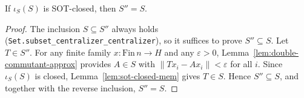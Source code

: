 \begin{theorem}
    \label{thm:sot-imp-dct}
    \leanok
    If $\iota_S(S)$ is SOT-closed, then $S'' = S$.
\end{theorem}
\begin{proof}
    The inclusion $S \subseteq S''$ always holds
    (\texttt{Set.subset\_centralizer\_centralizer}), so it suffices to prove
    $S'' \subseteq S$. Let $T \in S''$. For any finite family
    $x : \mathrm{Fin}\, n \to H$ and any $\varepsilon > 0$,
    Lemma~\ref{lem:double-commutant-approx} provides $A \in S$ with
    $\|T x_i - A x_i\| < \varepsilon$ for all $i$. Since $\iota_S(S)$ is closed,
    Lemma~\ref{lem:sot-closed-mem} gives $T \in S$. Hence
    $S'' \subseteq S$, and together with the reverse inclusion, $S'' = S$.
\end{proof}


